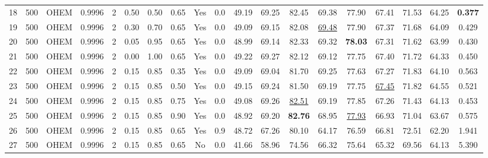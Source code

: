 \documentclass{article}
\begin{document}
\begin{table*}
{\begin{tabular}{c|ccccccccc|ccc|ccccc|c}
    18 & 500 & OHEM & 0.9996 & 2 & 0.50 & 0.50 & 0.65 & Yes & 0.0
    & 49.19 & 69.25 & {82.45} & 69.38 & 77.90 & {67.41} & 71.53 & 64.25 & \textbf{0.377} \\
     
    19 & 500 & OHEM & 0.9996 & 2 & 0.30 & 0.70 & 0.65 & Yes & 0.0
    & 49.09 & 69.15 & 82.08 & \underline{69.48} & 77.90 & 67.37 & 71.68 & 64.09 & 0.429 \\

    20 & 500 & OHEM & 0.9996 & 2 & 0.05 & 0.95 & 0.65 & Yes & 0.0
    & 48.99 & 69.14 & 82.33 & 69.32 & \textbf{78.03} & 67.31 & 71.62 & 63.99 & 0.430 \\
    
    21 & 500 & OHEM & 0.9996 & 2 & 0.00 & 1.00 & 0.65 & Yes & 0.0
    & 49.22 & {69.27} & 82.12 & 69.12 & 77.75 & 67.40 & 71.72 & 64.33 & 0.450 \\
    
    \noalign{\smallskip}
    \hline
    \noalign{\smallskip}
     
    22 & 500 & OHEM & 0.9996 & 2 & 0.15 & 0.85 & 0.35 & Yes & 0.0
    & 49.09 & 69.04 & 81.70 & 69.25 & 77.63 & 67.27 & 71.83 & 64.10 & 0.563 \\
    
    23 & 500 & OHEM & 0.9996 & 2 & 0.15 & 0.85 & 0.50 & Yes & 0.0
    & 49.15 & 69.24 & 81.50 & 69.19 & 77.75 & \underline{67.45} & 71.82 & 64.55 & 0.521 \\
    
    24 & 500 & OHEM & 0.9996 & 2 & 0.15 & 0.85 & 0.75 & Yes & 0.0
    & 49.08 & 69.26 & \underline{82.51} & 69.19 & 77.85 & 67.26 & 71.43 & 64.13 & 0.453 \\
    
    25 & 500 & OHEM & 0.9996 & 2 & 0.15 & 0.85 & 0.90 & Yes & 0.0
    & 48.92 & 69.20 & \textbf{82.76} & 68.95 & \underline{77.93} & 66.93 & 71.04 & 63.67 & 0.575 \\

    \noalign{\smallskip}
    \hline
    \noalign{\smallskip}

    26 & 500 & OHEM & 0.9996 & 2 & 0.15 & 0.85 & 0.65 & Yes & 0.9 
    & 48.72 & 67.26 & 80.10 & 64.17 & 76.59 & 66.81 & 72.51 & 62.20 & 1.941 \\ 

    \noalign{\smallskip}
    \hline
    \noalign{\smallskip}

    27 & 500 & OHEM & 0.9996 & 2 & 0.15 & 0.85 & 0.65 & No & 0.0
    & 41.66  & 58.96 & 74.56 & 66.32 & 75.64 & 65.32 & 69.56 & 64.13 & 5.390 \\


\end{tabular}}
\end{table*}
\end{document}
